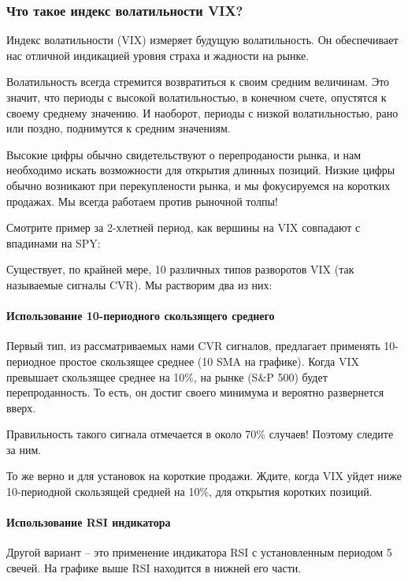 \documentclass{book}
\begin{document}
\subsubsection{Что такое индекс волатильности VIX?}

Индекс волатильности  (VIX) измеряет будущую волатильность. Он обеспечивает нас отличной индикацией уровня страха и жадности на рынке.

Волатильность всегда стремится возвратиться к своим средним величинам. Это значит, что периоды с высокой волатильностью, в конечном счете, опустятся к своему среднему значению. И наоборот, периоды с низкой волатильностью, рано или поздно, поднимутся к средним значениям.

Высокие цифры обычно свидетельствуют о перепроданости рынка, и нам необходимо искать возможности для открытия длинных позиций. Низкие цифры обычно возникают при перекуплености рынка, и мы фокусируемся на коротких продажах. Мы всегда работаем против рыночной толпы!

Смотрите пример за 2-хлетней период, как вершины на VIX совпадают с впадинами на SPY:

Существует, по крайней мере, 10 различных типов разворотов VIX (так
называемые сигналы CVR). Мы растворим два из них:

\paragraph{Использование 10-периодного скользящего среднего}

Первый тип, из рассматриваемых нами CVR сигналов, предлагает применять 10-периодное простое скользящее среднее (10 SMA на графике). Когда VIX превышает скользящее среднее на 10\%, на рынке (S\&P 500) будет перепроданность. То есть, он достиг своего минимума и вероятно развернется вверх.

Правильность такого сигнала отмечается в около 70\% случаев! Поэтому следите за ним.

То же верно и для установок на короткие продажи. Ждите, когда VIX
уйдет ниже 10-периодной скользящей средней на 10\%, для открытия коротких позиций.

\paragraph{Использование RSI индикатора}

Другой вариант – это применение индикатора RSI с установленным периодом 5 свечей. На графике выше RSI находится в нижней его части.
\end{document}
